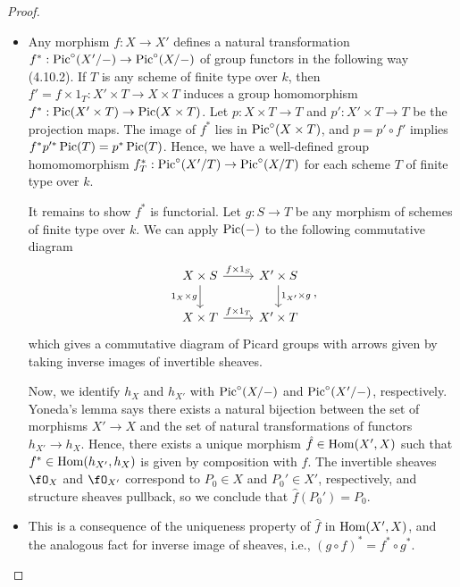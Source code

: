 \documentclass[a4paper]{article}
\begin{document}
\begin{enumerate} [label=\textbf{\arabic*.}, leftmargin=0em]
\begin{proof}
              \begin{itemize} [leftmargin=0cm]
                  \item[(a)] Any morphism $f : X \to X'$ defines a natural transformation $f^* : \operatorname{Pic}^\circ(X' / -) \to \operatorname{Pic}^\circ(X / -)$ of group functors in the following way (4.10.2).
                        If $T$ is any scheme of finite type over $k$, then $f' = f \times 1_T : X' \times T \to X \times T$ induces a group homomorphism $f^* : \operatorname{Pic}(X' \times T) \to \operatorname{Pic}(X \times T)$.
                        Let $p : X \times T \to T$ and $p' : X' \times T \to T$ be the projection maps.
                        The image of $f^*$ lies in $\operatorname{Pic}^\circ(X \times T)$, and $p = p' \circ f'$ implies $f^* p'^* \operatorname{Pic}(T) = p^* \operatorname{Pic}(T)$.
                        Hence, we have a well-defined group homomomorphism $f^*_T : \operatorname{Pic}^\circ(X'/T) \to \operatorname{Pic}^\circ(X/T)$ for each scheme $T$ of finite type over $k$.

                        It remains to show $f^*$ is functorial.
                        Let $g : S \to T$ be any morphism of schemes of finite type over $k$.
                        We can apply $\operatorname{Pic}(-)$ to the following commutative diagram
                        \[ \begin{tikzcd}
                                X \times S \arrow[d, "1_X \times g"'] \arrow[r, "f \times 1_S"] & X' \times S \arrow[d, "1_{X'} \times g"] \\
                                X \times T \arrow[r, "f \times 1_T"]                 & X' \times T
                            \end{tikzcd}, \]
                        which gives a commutative diagram of Picard groups with arrows given by taking inverse images of invertible sheaves.

                        Now, we identify $h_X$ and $h_{X'}$ with $\operatorname{Pic}^\circ(X/-)$ and $\operatorname{Pic}^\circ(X'/-)$, respectively.
                        Yoneda's lemma says there exists a natural bijection between the set of morphisms $X' \to X$ and the set of natural transformations of functors $h_{X'} \to h_X$.
                        Hence, there exists a unique morphism $\hat{f} \in \operatorname{Hom}(X', X)$ such that $f^* \in \operatorname{Hom}(h_{X'}, h_X)$ is given by composition with $\hat{f}$.
                        The invertible sheaves $\fO_X$ and $\fO_{X'}$ correspond to $P_0 \in X$ and $P_0' \in X'$, respectively, and structure sheaves pullback, so we conclude that $\hat{f}(P_0') = P_0$.

                  \item[(b)] This is a consequence of the uniqueness property of $\hat{f}$ in $\operatorname{Hom}(X', X)$, and the analogous fact for inverse image of sheaves, i.e., $(g \circ f)^* = f^* \circ g^*$.


\end{itemize}
\end{proof}
\end{enumerate}
\end{document}

